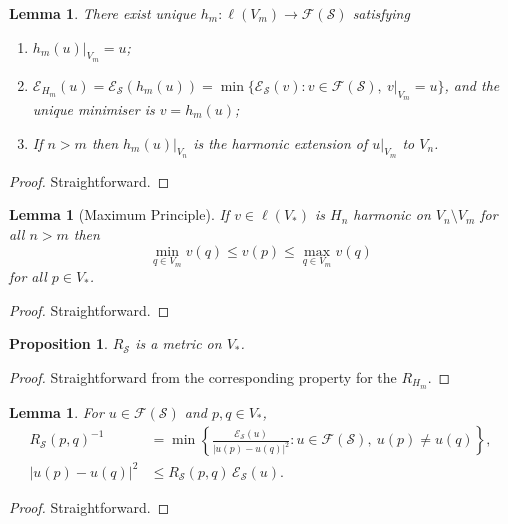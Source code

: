 \documentclass[a4paper]{amsart}
\theoremstyle{plain}
\newtheorem{lemma}[theorem]{Lemma}
\newtheorem{proposition}[theorem]{Proposition}
\theoremstyle{definition}
\theoremstyle{remark}
\begin{document}
\begin{lemma} There exist  unique $ h_m : \ell(V_m) \to \mathcal{F} ( \mathcal{S} ) $ satisfying 
\begin{enumerate}
\item $ h_m(u)|_{V_m} = u $;
\item $ \mathcal{E} _{H_m} (u) = \mathcal{E} _{ \mathcal{S} } (h_m(u)) =
  \min\{ \mathcal{E} _ { \mathcal{S} } (v) :  v \in \mathcal{F} ( \mathcal{S} ), \ v|_{V_m} = u \} $, and the unique minimiser is $ v = h_m(u) $;
  \item If $ n > m $ then $ h_m(u)|_{V_n} $ is the harmonic extension of $ u|_{V_m} $ to $ V_n $.
\end{enumerate} 
\end{lemma} 

\begin{proof} Straightforward. \end{proof} 

\begin{lemma}[Maximum Principle] If $ v \in \ell(V_*) $ is $ H_n $ harmonic on $ V_n \setminus V_m $ for all $ n > m $ then 
\[
\min_{q \in V_m } v(q) \leq v(p) \leq \max_{q \in V_m } v(q) 
\]
for all $ p \in V_* $.
\end{lemma}

\begin{proof} Straightforward. \end{proof} 

\begin{proposition} \label{rsm} $ R_{ \mathcal{S} } $  is a metric on $ V_* $.
\end{proposition} 

\begin{proof} Straightforward from the corresponding property for the $ R_{H_m} $. \end{proof} 


\begin{lemma} \label{per} For   $ u \in \mathcal{F} ( \mathcal{S} ) $ and $ p,q \in V_* $,
\begin{align*} 
R_{ \mathcal{S} } (p,q)^{-1} &= \min \left\{ \frac{ \mathcal{E} _ { \mathcal{S} } (u) } { |u(p) - u(q)|^2 } : u \in \mathcal{F} ( \mathcal{S} ),\ u(p) \neq u(q) \right\}, \\
|u(p) - u(q)|^2 &\leq R_{ \mathcal{S} } (p,q)\, \mathcal{E} _ { \mathcal{S} } (u) .
\end{align*} 
\end{lemma} 

\begin{proof} Straightforward. \end{proof} 
\end{document}
